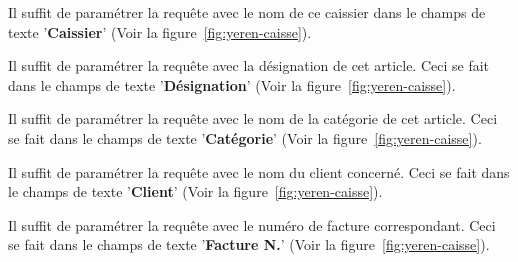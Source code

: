Il suffit de param\'etrer la requ\^ete avec le nom de ce
caissier dans le champs de texte '\textbf{Caissier}' (Voir
la figure~\ref{fig:yeren-caisse}).



Il suffit de param\'etrer la requ\^ete avec la d\'esignation
de cet article. Ceci se fait dans le champs de texte
'\textbf{D\'esignation}' (Voir la figure~\ref{fig:yeren-caisse}).



Il suffit de param\'etrer la requ\^ete avec le nom de la
cat\'egorie de cet article. Ceci se fait dans le champs
de texte '\textbf{Cat\'egorie}' (Voir la figure~\ref{fig:yeren-caisse}).



Il suffit de param\'etrer la requ\^ete avec le nom du
client concern\'e. Ceci se fait dans le champs de
texte '\textbf{Client}' (Voir la figure~\ref{fig:yeren-caisse}).



Il suffit de param\'etrer la requ\^ete avec le num\'ero
de facture correspondant. Ceci se fait dans le champs de
texte '\textbf{Facture N.}' (Voir la figure~\ref{fig:yeren-caisse}).



